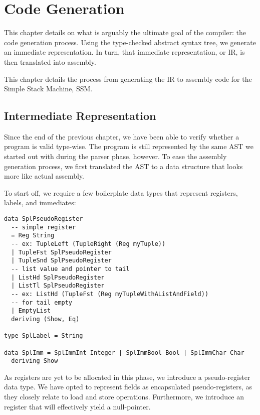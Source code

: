 \chapter{Code Generation}

This chapter details on what is arguably the ultimate goal of the compiler: the code generation process.
Using the type-checked abstract syntax tree, we generate an immediate representation.
In turn, that immediate representation, or IR, is then translated into assembly.

This chapter details the process from generating the IR to assembly code for the Simple Stack Machine, SSM.


\section{Intermediate Representation}

Since the end of the previous chapter, we have been able to verify whether a program is valid type-wise.
The program is still represented by the same AST we started out with during the parser phase, however.
To ease the assembly generation process, we first translated the AST to a data structure that looks more like actual assembly.

To start off, we require a few boilerplate data types that represent registers, labels, and immediates:

\begin{verbatim}
data SplPseudoRegister
  -- simple register
  = Reg String
  -- ex: TupleLeft (TupleRight (Reg myTuple))
  | TupleFst SplPseudoRegister
  | TupleSnd SplPseudoRegister
  -- list value and pointer to tail
  | ListHd SplPseudoRegister
  | ListTl SplPseudoRegister
  -- ex: ListHd (TupleFst (Reg myTupleWithAListAndField))
  -- for tail empty
  | EmptyList
  deriving (Show, Eq)

type SplLabel = String

data SplImm = SplImmInt Integer | SplImmBool Bool | SplImmChar Char
  deriving Show
\end{verbatim}

As registers are yet to be allocated in this phase, we introduce a pseudo-register data type.
We have opted to represent fields as encapsulated pseudo-registers, as they closely relate to load and store operations.
Furthermore, we introduce an  register that will effectively yield a null-pointer.

